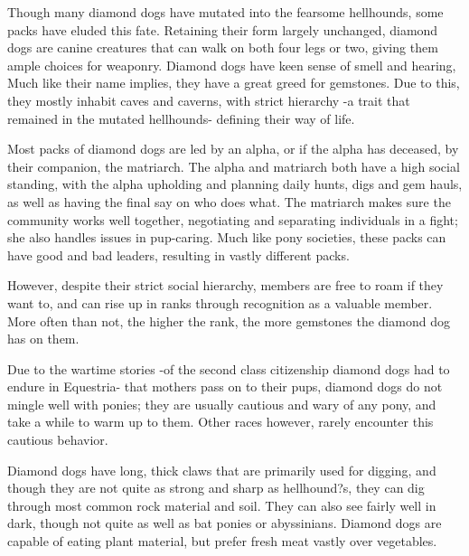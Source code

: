 \documentclass[11pt,a4paper,twocolumn]{book}
\begin{document}
	Though many diamond dogs have mutated into the fearsome hellhounds, some packs have eluded this fate. Retaining their form largely unchanged, diamond dogs are canine creatures that can walk on both four legs or two, giving them ample choices for weaponry.
	Diamond dogs have keen sense of smell and hearing, Much like their name implies, they have a great greed for gemstones. Due to this, they mostly inhabit caves and caverns, with strict hierarchy -a trait that remained in the mutated hellhounds- defining their way of life.
	
	Most packs of diamond dogs are led by an alpha, or if the alpha has deceased, by their companion, the matriarch. The alpha and matriarch both have a high social standing, with the alpha upholding and planning daily hunts, digs and gem hauls, as well as having the final say on who does what. The matriarch makes sure the community works well together, negotiating and separating individuals in a fight; she also handles issues in pup-caring. Much like pony societies, these packs can have good and bad leaders, resulting in vastly different packs. 
	
	However, despite their strict social hierarchy, members are free to roam if they want to, and can rise up in ranks through recognition as a valuable member. More often than not, the higher the rank, the more gemstones the diamond dog has on them. 
	
	Due to the wartime stories -of the second class citizenship diamond dogs had to endure in Equestria- that mothers pass on to their pups, diamond dogs do not mingle well with ponies; they are usually cautious and wary of any pony, and take a while to warm up to them. Other races however, rarely encounter this cautious behavior.
	
	Diamond dogs have long, thick claws that are primarily used for digging, and though they are not quite as strong and sharp as hellhound?s, they can dig through most common rock material and soil. They can also see fairly well in dark, though not quite as well as bat ponies or abyssinians. Diamond dogs are capable of eating plant material, but prefer fresh meat vastly over vegetables.
	
\end{document}
